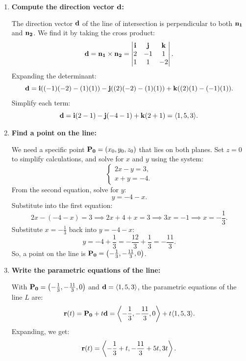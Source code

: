 \begin{example}
\begin{solution}
\begin{enumerate}
    \begin{enumerate}
        \item \textbf{Compute the direction vector \( \vb{d} \):}
        
        \noindent The direction vector \( \vb{d} \) of the line of intersection is perpendicular to both \( \vb{n_1} \) and \( \vb{n_2} \). We find it by taking the cross product:
        \[
        \vb{d} = \vb{n_1} \times \vb{n_2} = \begin{vmatrix} \vb{i} & \vb{j} & \vb{k} \\ 2 & -1 & 1 \\ 1 & 1 & -2 \end{vmatrix}.
        \]
        Expanding the determinant:
        \[
        \vb{d} = \vb{i}((-1)(-2) - (1)(1)) - \vb{j}((2)(-2) - (1)(1)) + \vb{k}((2)(1) - (-1)(1)).
        \]
        Simplify each term:
        \[
        \vb{d} = \vb{i}(2 - 1) - \vb{j}(-4 - 1) + \vb{k}(2 + 1) = \langle 1, 5, 3 \rangle.
        \]
        
        \item \textbf{Find a point on the line:}
        
        \noindent We need a specific point \( \vb{P_0} = (x_0, y_0, z_0) \) that lies on both planes. Set \( z = 0 \) to simplify calculations, and solve for \( x \) and \( y \) using the system:
        \[
        \begin{cases}
        2x - y = 3, \\
        x + y = -4.
        \end{cases}
        \]
        From the second equation, solve for \( y \):
        \[
        y = -4 - x.
        \]
        Substitute into the first equation:
        \[
        2x - (-4 - x) = 3 \implies 2x + 4 + x = 3 \implies 3x = -1 \implies x = -\frac{1}{3}.
        \]
        Substitute \( x = -\frac{1}{3} \) back into \( y = -4 - x \):
        \[
        y = -4 + \frac{1}{3} = -\frac{12}{3} + \frac{1}{3} = -\frac{11}{3}.
        \]
        So, a point on the line is \( \vb{P_0} = \left( -\frac{1}{3}, -\frac{11}{3}, 0 \right) \).
        
        \item \textbf{Write the parametric equations of the line:}
        
        \noindent With \( \vb{P_0} = \left( -\frac{1}{3}, -\frac{11}{3}, 0 \right) \) and \( \vb{d} = \langle 1, 5, 3 \rangle \), the parametric equations of the line \( L \) are:
        \[
        \vb{r}(t) = \vb{P_0} + t \vb{d} = \left\langle -\frac{1}{3}, -\frac{11}{3}, 0 \right\rangle + t \langle 1, 5, 3 \rangle.
        \]
        Expanding, we get:
        \[
        \vb{r}(t) = \left\langle -\frac{1}{3} + t, -\frac{11}{3} + 5t, 3t \right\rangle.
        \]
        

\end{enumerate}
\end{enumerate}
\end{solution}
\end{example}
